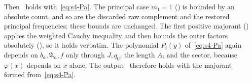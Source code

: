 \documentclass[11pt]{article}
\numberwithin{equation}{section}
\begin{document}
Then~\cite[eq.~(17.31)]{OAI78} holds with~\eqref{eq:s4-Pa}. The principal case $m_1=1$
(\cite[proof of Lemma~17.2, \emph{The first Poisson transformation}]{OAI78}) is bounded by an absolute count, and so are the discarded raw complement and the restored principal
frequencies; these bounds are unchanged. The first positive majorant (\cite[proof of Lemma~17.2, \emph{The first positive majorant}]{OAI78}) applies the weighted Cauchy
inequality and then bounds the outer factors absolutely (\cite[proof of Lemma~17.2, \emph{The first positive majorant}]{OAI78}), so it holds verbatim. The polynomial
$P_i(y)$ of~\eqref{eq:s4-Pa} again depends on $b_a,\mathfrak A_a,f$ only through $J,q_0$, the length $A_i$ and the
sector, because $\varphi(x)$ depends on $x$ alone. The output~\cite[eq.~(17.35)]{OAI78} therefore holds with the majorant~\cite[eq.~(17.33)]{OAI78} formed from~\eqref{eq:s4-Pa}.
\end{document}

